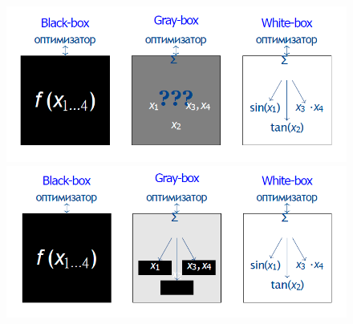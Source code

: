 \begin{figure}[h]
    \centering
    \includegraphics[width=0.8\linewidth]{images/colorbox.PNG}
    
    \includegraphics[width=0.8\linewidth]{images/colorbox2.PNG}
\end{figure}

